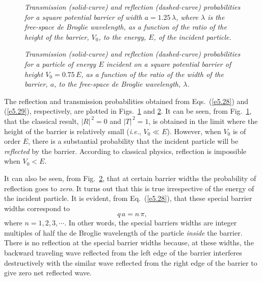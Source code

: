 \begin{figure}
\epsfysize=2.8in
\centerline{}
\caption{\em Transmission (solid-curve) and reflection (dashed-curve) probabilities for a square potential barrier of width $a=1.25\,\lambda$, where $\lambda$ is the free-space de Broglie wavelength, as a function
of the ratio of the height of the barrier, $V_0$, to the
energy, $E$, of the incident particle.}\label{fb1}   
\end{figure}

\begin{figure}
\epsfysize=2.8in
\centerline{}
\caption{\em Transmission (solid-curve) and reflection (dashed-curve) probabilities for a particle of energy $E$ incident on  a square potential barrier of height $V_0 = 0.75\,E$, as a function
of the ratio of the width of the barrier, $a$, to the free-space de Broglie
wavelength, $\lambda$.}\label{fb2}   
\end{figure}

The reflection  and transmission probabilities obtained from Eqs.~(\ref{e5.28}) and (\ref{e5.29}), respectively,  are plotted in Figs.~\ref{fb1} and
\ref{fb2}. It can be seen, from Fig.~\ref{fb1}, that the classical
result, $|R|^{\,2}=0$ and $|T|^{\,2}=1$, is obtained in the limit where the height of the barrier
is relatively small ({\em i.e.}, $V_0\ll E$). However, when $V_0$ is
of order $E$,  there is a substantial probability that the incident particle
will be {\em reflected}\/ by the barrier. According to classical physics, reflection is impossible when $V_0 < E$. 

It can also be seen, from Fig.~\ref{fb2},
that at certain barrier widths the probability of reflection goes to {\em zero}. It turns out that this is true irrespective of the energy of the incident particle.
It is evident, from Eq.~(\ref{e5.28}), that these special barrier widths
correspond to
\begin{equation}
q\,a = n\,\pi,
\end{equation}
where $n=1,2,3,\cdots$. In other words, the special barriers widths are
integer multiples of half the de Broglie wavelength of the particle {\em inside}\/ the
barrier. There is no reflection at the special barrier widths because, at these
widths,
the backward traveling wave reflected from the left edge of the barrier
interferes destructively with the similar wave reflected from the right
edge of the barrier to give zero net reflected wave.


